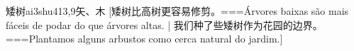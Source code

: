 \begin{EntryWithPhonetic}{矮树}{ai3shu4}{13,9}{⽮、⽊}
  [矮树比高树更容易修剪。===Árvores baixas são mais fáceis de podar do que árvores altas. | 我们种了些矮树作为花园的边界。===Plantamos alguns arbustos como cerca natural do jardim.]
\end{EntryWithPhonetic}

